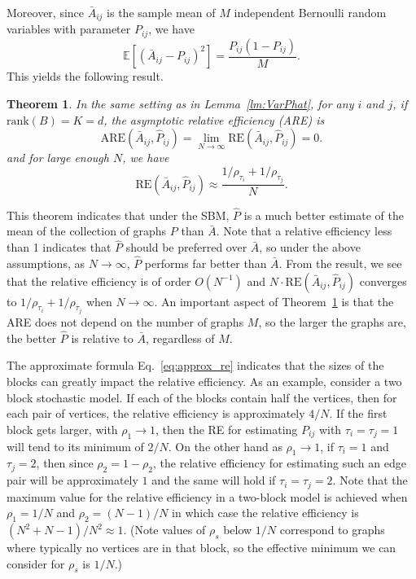 \documentclass[10pt,letterpaper]{article}
\newtheorem{theorem}[fact]{Theorem}
\newcommand{\Ex}{\mathbb{E}}
\renewcommand{\hat}{\widehat}
\begin{document}
Moreover, since $\bar{A}_{ij}$ is the sample mean of $M$ independent Bernoulli random variables with parameter $P_{ij}$, we have
\[
    \Ex[(\bar{A}_{ij} - P_{ij})^2] = \frac{P_{ij}(1-P_{ij})}{M}.
\]
This yields the following result.
\begin{theorem}
\label{thm:ARE}
In the same setting as in Lemma~\ref{lm:VarPhat}, for any $i$ and $j$, if $\mathrm{rank}(B)=K=d$, the asymptotic relative efficiency (ARE) is 
\[
    \mathrm{ARE}(\bar{A}_{ij}, \hat{P}_{ij}) = \lim_{N \to \infty} \mathrm{RE}(\bar{A}_{ij}, \hat{P}_{ij}) = 0.
    \label{eq:sbm_are}
\]
and for large enough $N$, we have
\begin{equation}
	    \mathrm{RE}(\bar{A}_{ij}, \hat{P}_{ij}) \approx
    \frac{1/\rho_{\tau_i} + 1/\rho_{\tau_j}}{N}.
\label{eq:approx_re}
\end{equation}
\end{theorem}


This theorem indicates that under the SBM, $\hat{P}$ is a much better estimate of the mean of the collection of graphs $P$ than $\bar{A}$.
Note that a relative efficiency less than 1 indicates that $\hat{P}$ should be preferred over $\bar{A}$, so under the above assumptions, as $N\to\infty$, $\hat{P}$ performs far better than $\bar{A}$.
From the result, we see that the relative efficiency is of order $O(N^{-1})$ and $N \cdot \mathrm{RE}(\bar{A}_{ij}, \hat{P}_{ij})$ converges to $1/\rho_{\tau_i}+1/\rho_{\tau_j}$ when $N\to\infty$.
An important aspect of Theorem~\ref{thm:ARE} is that the ARE does not depend on the number of graphs $M$, so the larger the graphs are, the better $\hat{P}$ is relative to $\bar{A}$, regardless of $M$.


The approximate formula Eq.~\ref{eq:approx_re} indicates that the sizes of the blocks can greatly impact the relative efficiency.
As an example, consider a two block stochastic model. 
If each of the blocks contain half the vertices, then for each pair of vertices, the relative efficiency is approximately $4/N$. 
If the first block gets larger, with $\rho_1\to 1$, then the RE for estimating $P_{ij}$ with $\tau_i=\tau_j=1$ will tend to its minimum of $2/N$. 
On the other hand as $\rho_1\to 1$, if $\tau_i=1$ and $\tau_j=2$, then since $\rho_2=1-\rho_2$, the relative efficiency for estimating such an edge pair will be approximately $1$ and the same will hold if $\tau_i=\tau_j=2$.
Note that the maximum value for the relative efficiency in a two-block model is achieved when $\rho_1=1/N$ and $\rho_2=(N-1)/N$ in which case the relative efficiency is $(N^2+N-1)/N^2\approx 1$.
(Note values of $\rho_s$ below $1/N$ correspond to graphs where typically no vertices are in that block, so the effective minimum we can consider for $\rho_s$ is $1/N$.)
\end{document}
